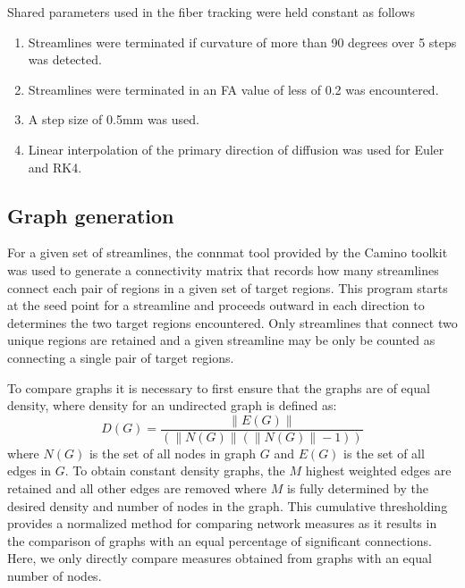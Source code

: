 \documentclass{frontiersSCNS} %
\begin{document}
Shared parameters used in the fiber tracking were held constant as follows
\begin{enumerate}
\item Streamlines were terminated if curvature of more than 90 degrees over 5 steps was detected. 
\item Streamlines were terminated in an FA value of less of 0.2 was encountered. 
\item A step size of 0.5mm was used. 
\item Linear interpolation of the primary direction of diffusion was used for Euler and RK4. 
\end{enumerate}


\subsection{Graph generation}
For a given set of streamlines, the connmat tool provided by  the Camino toolkit was used to generate
a connectivity matrix that records how many streamlines connect each pair of
regions in a given set of target regions. This program starts at the seed point for a streamline and proceeds outward in each
direction to determines the two target regions encountered. Only streamlines that connect two unique regions are retained and
a given streamline may be only be counted as connecting a single pair of target regions. 

To compare graphs it is necessary to first ensure that the graphs are of equal density, where density for an undirected graph is defined as:
$$D(G) = \frac{\|E(G)\|}{( \|N(G)\| (\|N(G)\|-1) )} $$
where $N(G)$ is the set of all nodes in graph $G$ and $E(G)$ is the set of all edges in $G$. To obtain constant density graphs, the $M$ highest weighted edges are retained and all other edges are removed where $M$ is fully determined by the desired density and number of nodes in the graph. This cumulative thresholding provides a normalized method for comparing network measures as it results in the comparison of graphs with an equal percentage of significant connections. Here, we only directly compare measures obtained from graphs with an equal number of nodes.

\end{document}
